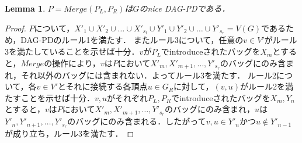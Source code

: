 \documentclass[master]{kuisthesis}		%
\theoremstyle{plain}
\newtheorem{lemma}{Lemma}
\theoremstyle{definition}
\begin{document}
\begin{lemma}
    $P=Merge(P_L, P_R)$は$G$のnice DAG-PDである．
\end{lemma}

\begin{proof} 
$P$について，$X'_1 \cup X'_2 \cup \dots \cup X'_{s_l} \cup Y'_1 \cup Y'_2 \cup \dots \cup Y'_{s_r} = V(G)$であるため，DAG-PDのルール1を満たす．
またルール3について，任意の$v \in V'$がルール3を満たしていることを示せば十分．$v$が$P_L$でintroduceされたバッグを$X_m$とすると，$Merge$の操作により，$v$は$P$において$X'_m, X'_{m+1}, \dots , Y'_{s_r}$のバッグにのみ含まれ，それ以外のバッグには含まれない．よってルール3を満たす．
ルール2について，各$v \in V'$とそれに接続する各頂点$u \in G_R$に対して，$(v, u)$がルール2を満たすことを示せば十分．$v, u$がそれぞれ$P_L, P_R$でintroduceされたバッグを$X_m, Y_n$とすると，$v$は$P$において$X'_m, X'_{m+1}, \dots , Y'_{s_r}$のバッグにのみ含まれ，$u$は$Y'_n, Y'_{n+1}, \dots , Y'_{s_r}$のバッグにのみ含まれる．したがって$v, u \in Y'_n$かつ$u \notin Y'_{n-1}$が成り立ち，ルール3を満たす．
\end{proof} 

\end{document}
